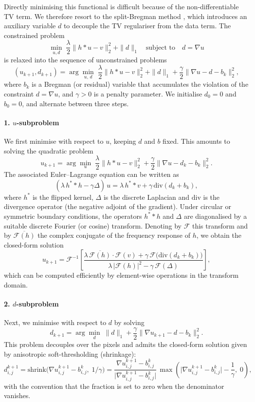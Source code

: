 \documentclass[a4paper,11pt]{article}
\begin{document}
Directly minimising this functional is difficult because of the non-differentiable
TV term. We therefore resort to the split-Bregman method \cite{goldsb,tvipol},
which introduces an auxiliary variable $d$ to decouple the TV regulariser from
the data term. The constrained problem
\[
\min_{u,d}\;\frac{\lambda}{2}\|h*u - v\|_2^2 + \|d\|_1
\quad\text{subject to}\quad d = \nabla u
\]
is relaxed into the sequence of unconstrained problems
\[
(u_{k+1}, d_{k+1})
=
\arg\min_{u,\, d}
\;
\frac{\lambda}{2}\|h*u - v\|_2^2
+
\|d\|_1
+
\frac{\gamma}{2}\|\nabla u - d - b_k\|_2^2,
\]
where $b_k$ is a Bregman (or residual) variable that accumulates the violation
of the constraint $d = \nabla u$, and $\gamma>0$ is a penalty parameter. We
initialise $d_0 = 0$ and $b_0 = 0$, and alternate between three steps.

\paragraph{1. $u$-subproblem}
We first minimise with respect to $u$, keeping $d$ and $b$ fixed. This amounts
to solving the quadratic problem
\[
u_{k+1}
=
\arg\min_u\;
\frac{\lambda}{2}\|h*u - v\|_2^2
+
\frac{\gamma}{2}\|\nabla u - d_k - b_k\|_2^2.
\]
The associated Euler--Lagrange equation can be written as
\[
(\lambda\,h^\ast * h - \gamma\Delta)\,u
=
\lambda\,h^\ast * v + \gamma\,\mathrm{div}(d_k + b_k),
\]
where $h^\ast$ is the flipped kernel, $\Delta$ is the discrete Laplacian and
$\mathrm{div}$ is the divergence operator (the negative adjoint of the
gradient). Under circular or symmetric boundary conditions, the operators
$h^\ast*h$ and $\Delta$ are diagonalised by a suitable discrete Fourier (or
cosine) transform. Denoting by $\mathcal{F}$ this transform and by
$\overline{\mathcal{F}(h)}$ the complex conjugate of the frequency response of
$h$, we obtain the closed-form solution
\[
u_{k+1}
=
\mathcal{F}^{-1}\!\left[
\frac{
    \lambda\,\overline{\mathcal{F}(h)} \cdot \mathcal{F}(v)
    +
    \gamma\,\mathcal{F}\!\big(\mathrm{div}(d_k + b_k)\big)
}{
    \lambda\,|\mathcal{F}(h)|^2
    -
    \gamma\,\mathcal{F}(\Delta)
}
\right],
\]
which can be computed efficiently by element-wise operations in the transform
domain.

\paragraph{2. $d$-subproblem}
Next, we minimise with respect to $d$ by solving
\[
d_{k+1}
=
\arg\min_d\;
\|d\|_1
+
\frac{\gamma}{2}\|\nabla u_{k+1} - d - b_k\|_2^2.
\]
This problem decouples over the pixels and admits the closed-form solution
given by anisotropic soft-thresholding (shrinkage):
\[
d_{i,j}^{k+1}
=
\mathrm{shrink}\big(\nabla u_{i,j}^{k+1} - b_{i,j}^k,\;1/\gamma\big)
=
\frac{\nabla u_{i,j}^{k+1} - b_{i,j}^k}{\big\lvert \nabla u_{i,j}^{k+1} - b_{i,j}^k\big\rvert}
\,
\max\!\left(
    \big\lvert \nabla u_{i,j}^{k+1} - b_{i,j}^k\big\rvert - \frac{1}{\gamma},
    \; 0
\right),
\]
with the convention that the fraction is set to zero when the denominator
vanishes.
\end{document}
